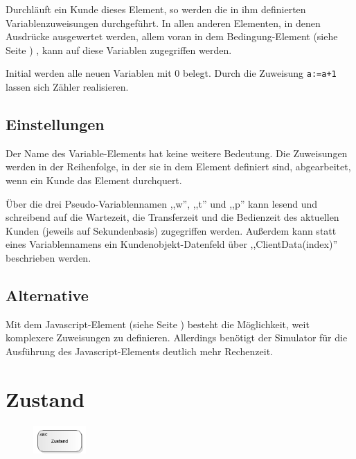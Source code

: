Durchläuft ein Kunde dieses Element, so werden die in ihm definierten Variablenzuweisungen durchgeführt.
In allen anderen Elementen, in denen Ausdrücke ausgewertet werden, allem voran in dem
Bedingung-Element (siehe Seite \pageref{ref:ModelElementHold}) , kann auf diese Variablen zugegriffen werden.

Initial werden alle neuen Variablen mit 0 belegt. Durch die Zuweisung \texttt{a:=a+1} lassen sich
Zähler realisieren.

\subsection*{Einstellungen}

Der Name des Variable-Elements hat keine weitere Bedeutung. Die Zuweisungen werden in der Reihenfolge, in der
sie in dem Element definiert sind, abgearbeitet, wenn ein Kunde das Element durchquert.

Über die drei Pseudo-Variablennamen ,,w'', ,,t'' und ,,p'' kann lesend und schreibend auf die Wartezeit, die Transferzeit
und die Bedienzeit des aktuellen Kunden (jeweils auf Sekundenbasis) zugegriffen werden. Außerdem kann statt eines
Variablennamens ein Kundenobjekt-Datenfeld über ,,ClientData(index)'' beschrieben werden.

\subsection*{Alternative}

Mit dem Javascript-Element (siehe Seite \pageref{ref:ModelElementSetJS}) besteht die Möglichkeit, weit komplexere
Zuweisungen zu definieren. Allerdings benötigt der Simulator für die Ausführung
des Javascript-Elements deutlich mehr Rechenzeit.


\section{Zustand}
\label{ref:ModelElementStateStatistics}

\begin{figure}
\vspace{-22pt}
\includegraphics[width=2cm]{imageModelElementStateStatistics.png}
\vspace{-22pt}
\end{figure}

